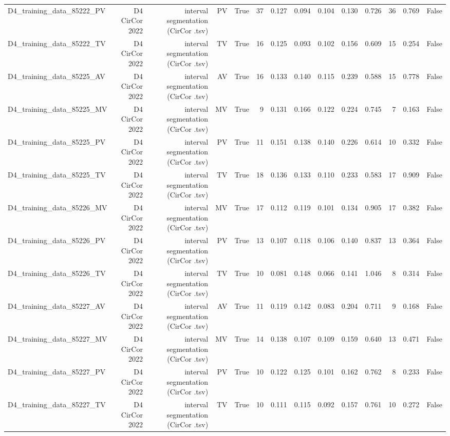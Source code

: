 \begin{table}[htbp]
\begin{tabular}{lrrrrrrrrrrrrr}
    D4\_training\_data\_85222\_PV & D4 CirCor 2022 & interval segmentation (CirCor .tsv) & PV & True & 37 & 0.127 & 0.094 & 0.104 & 0.130 & 0.726 & 36 & 0.769 & False \\
    D4\_training\_data\_85222\_TV & D4 CirCor 2022 & interval segmentation (CirCor .tsv) & TV & True & 16 & 0.125 & 0.093 & 0.102 & 0.156 & 0.609 & 15 & 0.254 & False \\
    D4\_training\_data\_85225\_AV & D4 CirCor 2022 & interval segmentation (CirCor .tsv) & AV & True & 16 & 0.133 & 0.140 & 0.115 & 0.239 & 0.588 & 15 & 0.778 & False \\
    D4\_training\_data\_85225\_MV & D4 CirCor 2022 & interval segmentation (CirCor .tsv) & MV & True & 9 & 0.131 & 0.166 & 0.122 & 0.224 & 0.745 & 7 & 0.163 & False \\
    D4\_training\_data\_85225\_PV & D4 CirCor 2022 & interval segmentation (CirCor .tsv) & PV & True & 11 & 0.151 & 0.138 & 0.140 & 0.226 & 0.614 & 10 & 0.332 & False \\
    D4\_training\_data\_85225\_TV & D4 CirCor 2022 & interval segmentation (CirCor .tsv) & TV & True & 18 & 0.136 & 0.133 & 0.110 & 0.233 & 0.583 & 17 & 0.909 & False \\
    D4\_training\_data\_85226\_MV & D4 CirCor 2022 & interval segmentation (CirCor .tsv) & MV & True & 17 & 0.112 & 0.119 & 0.101 & 0.134 & 0.905 & 17 & 0.382 & False \\
    D4\_training\_data\_85226\_PV & D4 CirCor 2022 & interval segmentation (CirCor .tsv) & PV & True & 13 & 0.107 & 0.118 & 0.106 & 0.140 & 0.837 & 13 & 0.364 & False \\
    D4\_training\_data\_85226\_TV & D4 CirCor 2022 & interval segmentation (CirCor .tsv) & TV & True & 10 & 0.081 & 0.148 & 0.066 & 0.141 & 1.046 & 8 & 0.314 & False \\
    D4\_training\_data\_85227\_AV & D4 CirCor 2022 & interval segmentation (CirCor .tsv) & AV & True & 11 & 0.119 & 0.142 & 0.083 & 0.204 & 0.711 & 9 & 0.168 & False \\
    D4\_training\_data\_85227\_MV & D4 CirCor 2022 & interval segmentation (CirCor .tsv) & MV & True & 14 & 0.138 & 0.107 & 0.109 & 0.159 & 0.640 & 13 & 0.471 & False \\
    D4\_training\_data\_85227\_PV & D4 CirCor 2022 & interval segmentation (CirCor .tsv) & PV & True & 10 & 0.122 & 0.125 & 0.101 & 0.162 & 0.762 & 8 & 0.233 & False \\
    D4\_training\_data\_85227\_TV & D4 CirCor 2022 & interval segmentation (CirCor .tsv) & TV & True & 10 & 0.111 & 0.115 & 0.092 & 0.157 & 0.761 & 10 & 0.272 & False \\

\end{tabular}
\end{table}
